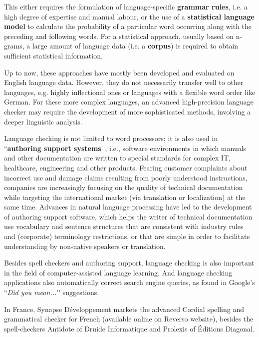 \begin{multicols}{2}
This either requires the formulation of language-specific {\bf grammar
rules}, i.e. a high degree of expertise and manual labour, or the use
of a {\bf statistical language model} to calculate the probability of a
particular word occurring along with the preceding and following
words. For a statistical approach, usually based on n-grams, a large
amount of language data (i.e. a {\bf corpus}) is required to obtain
sufficient statistical information.  

Up to now, these approaches have mostly been developed and evaluated
on English language data. However, they do not necessarily transfer
well to other languages, e.g. highly inflectional ones or languages
with a flexible word order like German. For these more complex
languages, an advanced high-precision language checker may require the
development of more sophisticated methods, involving a deeper
linguistic analysis.

Language checking is not limited to word processors; it is also used
in ``{\bf authoring support systems}{\mbox '}{\mbox '}, i.e., software environments in which
manuals and other documentation are written to special standards for
complex IT, healthcare, engineering and other products. Fearing
customer complaints about incorrect use and damage claims resulting
from poorly understood instructions, companies are increasingly
focusing on the quality of technical documentation while targeting the
international market (via translation or localization) at the same
time. Advances in natural language processing have led to the
development of authoring support software, which helps the writer of
technical documentation use vocabulary and sentence structures that
are consistent with industry rules and (corporate) terminology
restrictions, or that are simple in order to facilitate understanding
by non-native speakers or translation.

Besides spell checkers and authoring support, language checking is
also important in the field of computer-assisted language
learning. And language checking applications also automatically
correct search engine queries, as found in Google{\mbox '}s ``{\it Did you mean...}{\mbox '}{\mbox '}
suggestions.

In France, Synapse Développement markets the advanced Cordial spelling
and grammatical checker for French (available online on Reverso
website), besides the spell-checkers Antidote of Druide Informatique
and Prolexis of Éditions Diagonal.


\end{multicols}
